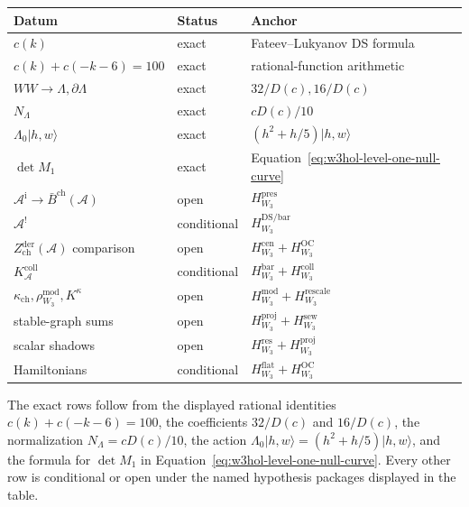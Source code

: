 \begin{center}
\renewcommand{\arraystretch}{1.25}
\begin{tabular}{lll}
\toprule
\textbf{Datum} & \textbf{Status} & \textbf{Anchor}\\
\midrule
\(c(k)\) & exact & Fateev--Lukyanov DS formula\\
\(c(k)+c(-k-6)=100\) & exact & rational-function arithmetic\\
\(WW\to\Lambda,\partial\Lambda\) & exact & \(32/D(c),16/D(c)\)\\
\(N_\Lambda\) & exact & \(cD(c)/10\)\\
\(\Lambda_0|h,w\rangle\) & exact & \((h^2+h/5)|h,w\rangle\)\\
\(\det M_1\) & exact & Equation~\eqref{eq:w3hol-level-one-null-curve}\\
\(\mathcal A^{\mathrm i}\to\bar B^{\mathrm{ch}}(\mathcal A)\)
& open & \(H_{W_3}^{\mathrm{pres}}\)\\
\(\mathcal A^{\mathord{!}}\) & conditional
& \(H_{W_3}^{\mathrm{DS/bar}}\)\\
\(Z_{\mathrm{ch}}^{\mathrm{der}}(\mathcal A)\) comparison
& open & \(H_{W_3}^{\mathrm{cen}}+H_{W_3}^{\mathrm{OC}}\)\\
\(K_{\mathcal A}^{\mathrm{coll}}\) & conditional
& \(H_{W_3}^{\mathrm{bar}}+H_{W_3}^{\mathrm{coll}}\)\\
\(\kappa_{\mathrm{ch}},\rho_{W_3}^{\mathrm{mod}},K^\kappa\)
& open & \(H_{W_3}^{\mathrm{mod}}+H_{W_3}^{\mathrm{rescale}}\)\\
stable-graph sums & open
& \(H_{W_3}^{\mathrm{proj}}+H_{W_3}^{\mathrm{sew}}\)\\
scalar shadows & open
& \(H_{W_3}^{\mathrm{res}}+H_{W_3}^{\mathrm{proj}}\)\\
Hamiltonians & conditional
& \(H_{W_3}^{\mathrm{flat}}+H_{W_3}^{\mathrm{OC}}\)\\
\bottomrule
\end{tabular}
\end{center}

The exact rows follow from the displayed rational identities
\(c(k)+c(-k-6)=100\), the coefficients \(32/D(c)\) and
\(16/D(c)\), the normalization \(N_\Lambda=cD(c)/10\), the action
\(\Lambda_0\lvert h,w\rangle=(h^2+h/5)\lvert h,w\rangle\), and the
formula for \(\det M_1\) in
Equation~\eqref{eq:w3hol-level-one-null-curve}.  Every other row is
conditional or open under the named hypothesis packages displayed in
the table.
